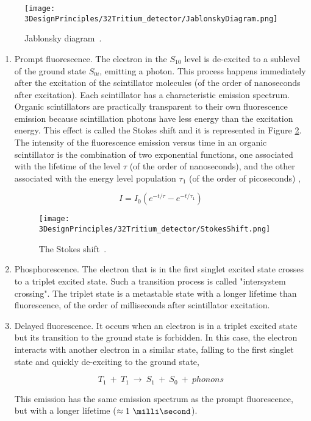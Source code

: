 \begin{figure}[htbp]
\centering
\texttt{[image: 3DesignPrinciples/32Tritium\_detector/JablonskyDiagram.png]}
\caption{Jablonsky diagram\label{fig:JablonskyDiagram}~\cite{Knoll}.}
\end{figure}

\begin{enumerate}

\item{} Prompt fluorescence. The electron in the $S_{10}$ level is de-excited to a sublevel of the ground state $S_{0i}$, emitting a photon. This process happens immediately after the excitation of the scintillator molecules (of the order of nanoseconds after excitation). Each scintillator has a characteristic emission spectrum. Organic scintillators are practically transparent to their own fluorescence emission because scintillation photons have less energy than the excitation energy. This effect is called the Stokes shift and it is represented in Figure \ref{fig:StokesShift}. The intensity of the fluorescence emission versus time in an organic scintillator is the combination of two exponential functions, one associated with the lifetime of the level $\tau$ (of the order of nanoseconds), and the other associated with the energy level population $\tau_1$ (of the order of picoseconds) \cite{Knoll},

\begin{equation}
I=I_0\left(e^{-t/\tau} - e^{-t/\tau_1}\right) 
\label{eq:IntensityTimeScintillator}
\end{equation}

\begin{figure}[htbp]
\centering
\texttt{[image: 3DesignPrinciples/32Tritium\_detector/StokesShift.png]}
\caption{The Stokes shift\label{fig:StokesShift}~\cite{Knoll}.}
\end{figure}

\item{} Phosphorescence. The electron that is in the first singlet excited state crosses to a triplet excited state. Such a transition process is called "intersystem crossing". The triplet state is a metastable state with a longer lifetime than fluorescence, of the order of milliseconds after scintillator excitation.

\item{} Delayed fluorescence. It occurs when an electron is in a triplet excited state but its transition to the ground state is forbidden. In this case, the electron interacts with another electron in a similar state, falling to the first singlet state and quickly de-exciting to the ground state, 

\begin{equation}
T_{1} ~+~ T_{1}~ \longrightarrow ~ S_{1} ~+~ S_{0} ~+~ phonons
\label{eq:DelayFluorescence}
\end{equation}

This emission has the same emission spectrum as the prompt fluorescence, but with a longer lifetime ($\approx 1~\milli\second$).
\end{enumerate}
